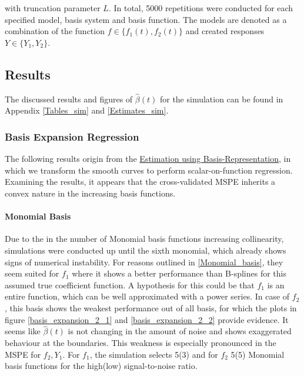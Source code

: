 \documentclass[11pt,twoside,a4paper]{article}
\begin{document}
		with truncation parameter $L$. In total, 5000 repetitions were conducted for each specified model, basis system and basis function. The models are denoted as a combination of the function $f \in \{f_1(t), f_2(t)\}$	and created responses $Y \in \{Y_1, Y_2\}$.
		
	\subsection{Results}	
	The discussed results and figures of $\hat{\beta}(t)$ for the simulation can be found in Appendix \ref{Tables_sim} and \ref{Estimates_sim}.
	 
	\subsubsection{Basis Expansion Regression}
	The following results origin from the \hyperref[basis_exp_transf]{Estimation using Basis-Representation}, in which we transform the smooth curves to perform scalar-on-function regression. Examining the results, it appears that the cross-validated MSPE inherits a convex nature in the increasing basis functions.
	
	\paragraph{Monomial Basis}
	Due to the in the number of Monomial basis functions increasing collinearity, simulations were conducted up until the sixth monomial, which already shows signs of numerical instability. For reasons outlined in \ref{Monomial_basis}, they seem suited for $f_1$ where it shows a better performance than B-splines for this assumed true coefficient function. A hypothesis for this could be that $f_1$ is an entire function, which can be well approximated with a power series. In case of $f_2$, this basis shows the weakest performance out of all basis, for which the plots in figure \ref{basis_expansion_2_1} and \ref{basis_expansion_2_2} provide evidence. It seems like $\hat{\beta}(t)$ is not changing in the amount of noise and shows exaggerated behaviour at the boundaries. This weakness is especially pronounced in the MSPE for $f_2,Y_1$. For $f_1$, the simulation selects 5(3) and for $f_2$ 5(5) Monomial basis functions for the high(low) signal-to-noise ratio. 
	\vspace{-0.2cm}
	
\end{document}
